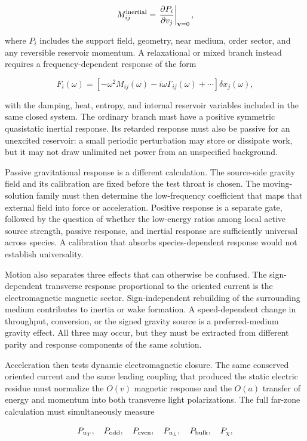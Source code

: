 \[
M_{ij}^{\rm inertial}
=
\left.\frac{\partial P_i}{\partial v_j}\right|_{\mathbf v=0},
\]

where \(P_i\) includes the support field, geometry, near medium, order sector,
and any reversible reservoir momentum. A relaxational or mixed branch instead
requires a frequency-dependent response of the form

\[
F_i(\omega)
=
\left[-\omega^2M_{ij}(\omega)-i\omega\Gamma_{ij}(\omega)+\cdots\right]
\delta x_j(\omega),
\]

with the damping, heat, entropy, and internal reservoir variables included in
the same closed system. The ordinary branch must have a positive symmetric
quasistatic inertial response. Its retarded response must also be passive for an
unexcited reservoir: a small periodic perturbation may store or dissipate work,
but it may not draw unlimited net power from an unspecified background.

Passive gravitational response is a different calculation. The source-side
gravity field and its calibration are fixed before the test throat is chosen.
The moving-solution family must then determine the low-frequency coefficient
that maps that external field into force or acceleration. Positive response is a
separate gate, followed by the question of whether the low-energy ratios among
local active source strength, passive response, and inertial response are
sufficiently universal across species. A calibration that absorbs
species-dependent response would not establish universality.

Motion also separates three effects that can otherwise be confused. The
sign-dependent transverse response proportional to the oriented current is the
electromagnetic magnetic sector. Sign-independent rebuilding of the surrounding
medium contributes to inertia or wake formation. A speed-dependent change in
throughput, conversion, or the signed gravity source is a preferred-medium
gravity effect. All three may occur, but they must be extracted from different
parity and response components of the same solution.

Acceleration then tests dynamic electromagnetic closure. The same conserved
oriented current and the same leading coupling that produced the static electric
residue must normalize the \(O(v)\) magnetic response and the \(O(a)\) transfer
of energy and momentum into both transverse light polarizations. The full
far-zone calculation must simultaneously measure

\[
P_{u_T},\quad
P_{\rm odd},\quad
P_{\rm even},\quad
P_{u_L},\quad
P_{\rm bulk},\quad
P_\chi,
\]

